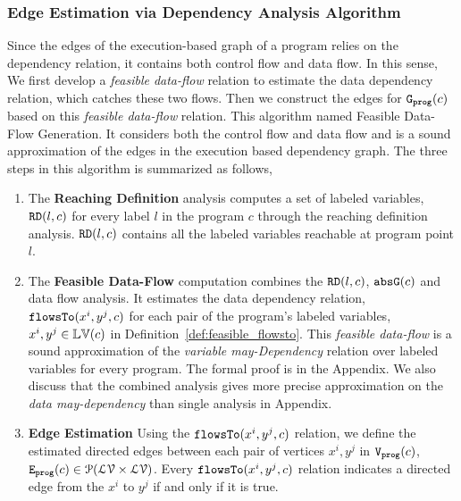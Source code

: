 \subsubsection{Edge Estimation via Dependency Analysis Algorithm}
\label{sec:alg_edgegen}
Since the edges of the execution-based graph of a program relies on the dependency relation, it contains both control flow and data flow. 
In this sense, We first develop a \emph{feasible data-flow} relation to estimate the data dependency relation, which catches these two flows.
Then we construct the edges for $\mathtt{{G_{prog}}}(c)$ based on this \emph{feasible data-flow} relation.
This algorithm named Feasible Data-Flow Generation. It 
considers both the control flow and data flow and
is a sound approximation of the edges in the execution based dependency graph.
The three steps in this algorithm is summarized as follows,
\begin{enumerate}
  \item The \textbf{Reaching Definition} analysis computes a set of labeled variables, $\mathtt{RD}(l, c)$ for every label $l$ in the program $c$ through the reaching definition analysis. 
  $\mathtt{RD}(l, c)$ contains all the labeled variables reachable at program point $l$. 
  \item The \textbf{Feasible Data-Flow} computation combines the $\mathtt{RD}(l, c)$, $\mathtt{abs}{\mathtt{G}}(c)$ and data flow analysis. It estimates the data dependency relation, $\mathtt{flowsTo}(x^i, y^j, c)$ for each pair of the program's labeled variables, $x^i, y^j \in \mathbb{LV}(c)$ in Definition~\ref{def:feasible_flowsto}. This \emph{feasible data-flow} is a sound approximation 
  of the \emph{variable may-Dependency} relation over labeled variables for every program.
  The formal proof is in the Appendix. We also discuss that the combined analysis gives more precise approximation on the \emph{data may-dependency} than single analysis in Appendix.
\item \textbf{Edge Estimation}
Using the $\mathtt{flowsTo}(x^i, y^j, c)$ relation, we define the estimated directed edges
between each pair of vertices $x^i, y^j$ in $\mathtt{{V_{prog}}}(c)$,
$\mathtt{{E_{prog}}}(c) \in \mathcal{P}( \mathcal{LV} \times \mathcal{LV})$.
Every $\mathtt{flowsTo}(x^i, y^j, c)$ relation indicates a directed edge from the $x^i$ to $y^j$ if and only if it is true.
\end{enumerate} 

